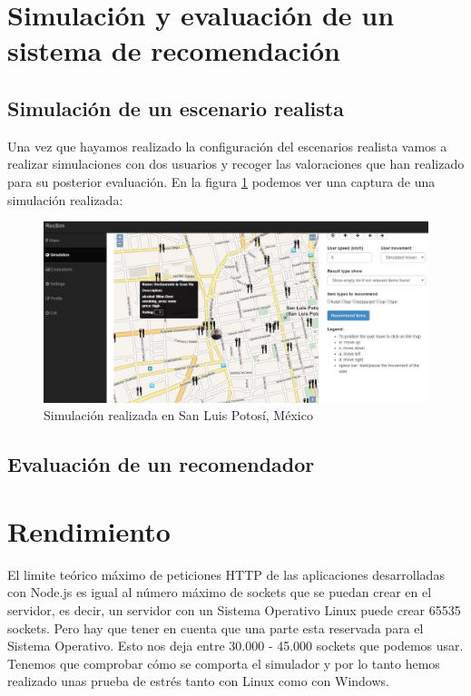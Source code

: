 \section{Simulación y evaluación de un sistema de recomendación}

\subsection{Simulación de un escenario realista}

Una vez que hayamos realizado la configuración del escenarios realista vamos a realizar simulaciones con dos usuarios y recoger las valoraciones que han realizado para su posterior evaluación. En la figura \ref{simulacionYEvaluacion} podemos ver una captura de una simulación realizada:

\begin{figure}[H]
	\centering\includegraphics[scale=0.35]{imagenes/explotacion/6.jpg}
	\caption{Simulación realizada en San Luis Potosí, México}
	\label{simulacionYEvaluacion}
\end{figure}

\subsection{Evaluación de un recomendador}




\section{Rendimiento}

El limite teórico máximo de peticiones HTTP de las aplicaciones desarrolladas con Node.js es igual al número máximo de sockets que se puedan crear en el servidor, es decir, un servidor con un Sistema Operativo Linux puede crear 65535 sockets. Pero hay que tener en cuenta que una parte esta reservada para el Sistema Operativo. Esto nos deja entre 30.000 - 45.000 sockets que podemos usar. Tenemos que comprobar cómo se comporta el simulador y por lo tanto hemos realizado unas prueba de estrés tanto con Linux como con Windows.

